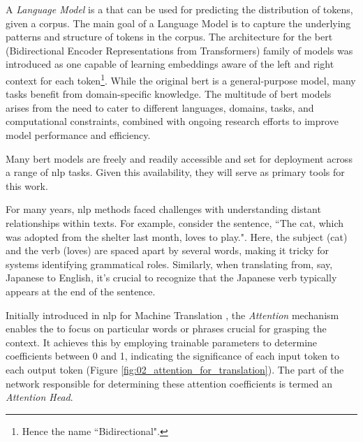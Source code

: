 \label{02_bert_models_for_text_classification}

A \emph{Language Model} is a \neuralNetwork{} that can be used for predicting the distribution of tokens, given a corpus. The main goal of a Language Model is to capture the underlying patterns and structure of tokens in the corpus.
The architecture for the \gls{bert} (Bidirectional Encoder Representations from Transformers) family of models was introduced  as one capable of learning embeddings aware of the left and right context for each token\footnote{Hence the name ``Bidirectional".}. 
While the original \gls{bert} is a general-purpose model, many tasks benefit from domain-specific knowledge. The multitude of \gls{bert} models arises from the need to cater to different languages, domains, tasks, and computational constraints, combined with ongoing research efforts to improve model performance and efficiency. 

Many \gls{bert} models are freely and readily accessible and set for deployment across a range of \gls{nlp} tasks. Given this availability, they will serve as primary tools for this work.



\label{02_attention_and_transformers}


For many years, \gls{nlp} methods faced challenges with understanding distant relationships within texts. For example, consider the sentence, ``The cat, which was adopted from the shelter last month, loves to play.". Here, the subject (cat) and the verb (loves) are spaced apart by several words, making it tricky for systems identifying grammatical roles. Similarly, when translating from, say, Japanese to English, it's crucial to recognize that the Japanese verb typically appears at the end of the sentence. 

Initially introduced in \gls{nlp} for Machine Translation , the \emph{Attention} mechanism enables the \neuralNetwork{} to focus on particular words or phrases crucial for grasping the context. 
It achieves this by employing trainable parameters to determine coefficients between 0 and 1, indicating the significance of each input token to each output token (Figure \ref{fig:02_attention_for_translation}). The part of the network responsible for determining these attention coefficients is termed an \emph{Attention Head}.

